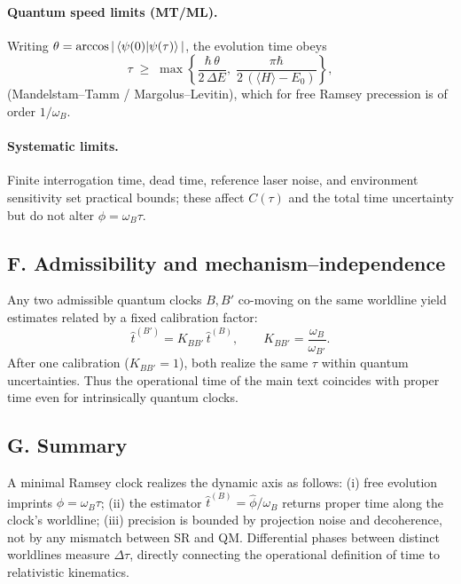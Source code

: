 \documentclass[12pt]{article}
\begin{document}
\paragraph{Quantum speed limits (MT/ML).}
Writing \(\theta=\arccos|\braket{\psi(0)}{\psi(\tau)}|\), the evolution time obeys
\[
\tau \;\ge\; \max\!\left\{\frac{\hbar\,\theta}{2\,\Delta E},\;
\frac{\pi\hbar}{2\,(\langle H\rangle-E_0)}\right\},
\]
(Mandelstam–Tamm / Margolus–Levitin), which for free Ramsey precession is of order
\(1/\omega_B\). \cite{MT1945,ML1998}

\paragraph{Systematic limits.}
Finite interrogation time, dead time, reference laser noise, and environment sensitivity set practical
bounds; these affect \(C(\tau)\) and the total time uncertainty but do not alter
\(\phi=\omega_B\tau\).

\subsection*{F. Admissibility and mechanism–independence}
Any two admissible quantum clocks \(B,B'\) co-moving on the same worldline yield estimates related by
a fixed calibration factor:
\[
\hat t^{(B')}=K_{BB'}\,\hat t^{(B)},\qquad K_{BB'}=\frac{\omega_B}{\omega_{B'}}.
\]
After one calibration (\(K_{BB'}=1\)), both realize the same \(\tau\) within quantum
uncertainties. Thus the operational time of the main text coincides with proper time even
for intrinsically quantum clocks.

\subsection*{G. Summary}
A minimal Ramsey clock realizes the dynamic axis as follows: (i) free evolution imprints
\(\phi=\omega_B\tau\); (ii) the estimator \(\hat t^{(B)}=\hat\phi/\omega_B\) returns proper time
along the clock’s worldline; (iii) precision is bounded by projection noise and decoherence,
not by any mismatch between SR and QM. Differential phases between distinct worldlines measure
\(\Delta\tau\), directly connecting the operational definition of time to relativistic kinematics.

\newpage
\end{document}
